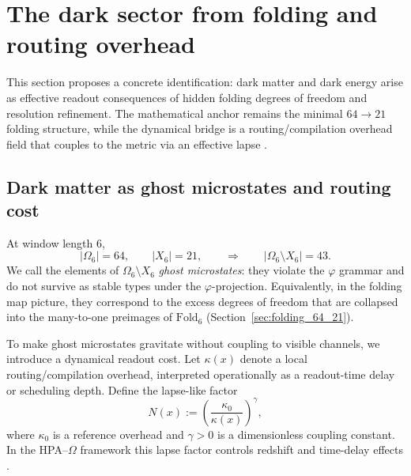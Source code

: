 
\section{The dark sector from folding and routing overhead}
\label{sec:dark_sector}

This section proposes a concrete identification: dark matter and dark energy arise as effective readout consequences of hidden folding degrees of freedom and resolution refinement.
The mathematical anchor remains the minimal $64\to 21$ folding structure, while the dynamical bridge is a routing/compilation overhead field that couples to the metric via an effective lapse \cite{Ma2025HPT,Ma2025CAP,Ma2025FoP}.

\subsection{Dark matter as ghost microstates and routing cost}
\label{subsec:dm_ghost_states}

At window length $6$,
\[
|\Omega_6|=64,\qquad |X_6|=21,
\qquad\Rightarrow\qquad |\Omega_6\setminus X_6|=43.
\]
We call the elements of $\Omega_6\setminus X_6$ \emph{ghost microstates}: they violate the $\varphi$ grammar and do not survive as stable types under the $\varphi$-projection.
Equivalently, in the folding map picture, they correspond to the excess degrees of freedom that are collapsed into the many-to-one preimages of $\mathrm{Fold}_6$ (Section~\ref{sec:folding_64_21}).

To make ghost microstates gravitate without coupling to visible channels, we introduce a dynamical readout cost.
Let $\kappa(x)$ denote a local routing/compilation overhead, interpreted operationally as a readout-time delay or scheduling depth.
Define the lapse-like factor
\[
N(x):=\left(\frac{\kappa_0}{\kappa(x)}\right)^{\gamma},
\]
where $\kappa_0$ is a reference overhead and $\gamma>0$ is a dimensionless coupling constant.
In the HPA--$\Omega$ framework this lapse factor controls redshift and time-delay effects \cite{Ma2025HPT}.

